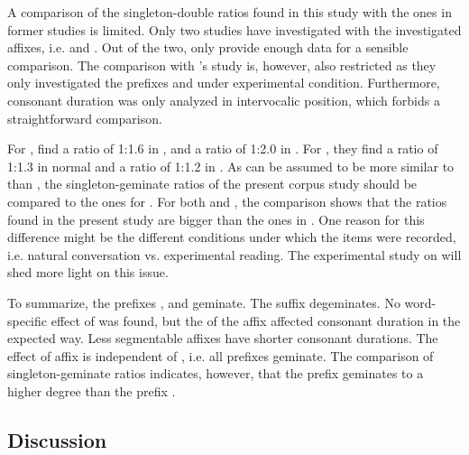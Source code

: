 A comparison of the singleton-double ratios found in this study with the ones in former studies is limited. Only two studies have investigated  with the investigated affixes, i.e. \cite{Kaye.2005} and \cite{Oh.2012}. Out of the two, only \cite{Oh.2012} provide enough data for a sensible comparison. The comparison with \citeauthor{Oh.2012}'s study is, however, also restricted as they only investigated the prefixes  and  under experimental condition. Furthermore, consonant duration was only analyzed in intervocalic position, which forbids a straightforward comparison. 
 
 For , \cite{Oh.2012} find a ratio of 1:1.6 in , and a ratio of 1:2.0 in . For , they find a ratio of 1:1.3 in normal and a ratio of 1:1.2 in . 
 As  can be assumed to be more similar to  than , the singleton-geminate ratios of the present corpus study should be compared to the ones for . 
 For both  and , the comparison shows that the ratios found in the present study are bigger than the ones in \cite{Oh.2012}. 
  One reason for this difference might be the different conditions under which the items were recorded, i.e. natural conversation vs. experimental reading. The experimental study on  will shed more light on this issue.

To summarize, the prefixes ,  and  geminate. The suffix  degeminates. No word-specific effect of  was found, but the  of the affix affected consonant duration in the expected way. Less segmentable affixes have shorter consonant durations. The effect of affix is independent of , i.e. all prefixes geminate. The comparison of singleton-geminate ratios indicates, however, that the prefix  geminates to a higher degree than the prefix .

\subsection{Discussion}



